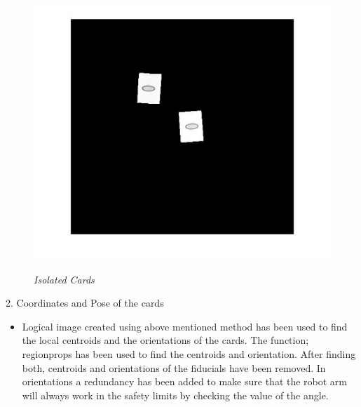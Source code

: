 \begin{figure}[position = here]
	\begin{centering}
		\includegraphics[scale=0.9]{./sachiths_images/image32.png}\\
		\caption[]{\textit{Isolated Cards}}
	\end{centering}
\end{figure}

2.	Coordinates and Pose of the cards
\begin{itemize}
	\item Logical image created using above mentioned method has been used to find the local centroids and the orientations of the cards. The function; regionprops has been used to find the centroids and orientation. After finding both, centroids and orientations of the fiducials have been removed. In orientations a redundancy has been added to make sure that the robot arm will always work in the safety limits by checking the value of the angle.
	
\end{itemize}

